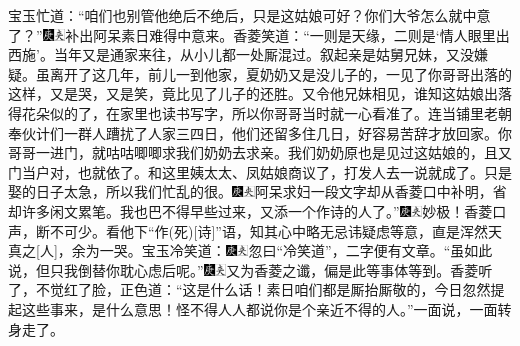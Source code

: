 宝玉忙道：``咱们也别管他绝后不绝后，只是这姑娘可好？你们大爷怎么就中意了？''{\includegraphics[width=3mm]{../Images/00004}\includegraphics[width=3mm]{../Images/00012}\footnotesize \kaishu 补出阿呆素日难得中意来。}香菱笑道：``一则是天缘，二则是`情人眼里出西施'。当年又是通家来往，从小儿都一处厮混过。叙起亲是姑舅兄妹，又没嫌疑。虽离开了这几年，前儿一到他家，夏奶奶又是没儿子的，一见了你哥哥出落的这样，又是哭，又是笑，竟比见了儿子的还胜。又令他兄妹相见，谁知这姑娘出落得花朵似的了，在家里也读书写字，所以你哥哥当时就一心看准了。连当铺里老朝奉伙计们一群人蹧扰了人家三四日，他们还留多住几日，好容易苦辞才放回家。你哥哥一进门，就咕咕唧唧求我们奶奶去求亲。我们奶奶原也是见过这姑娘的，且又门当户对，也就依了。和这里姨太太、凤姑娘商议了，打发人去一说就成了。只是娶的日子太急，所以我们忙乱的很。{\includegraphics[width=3mm]{../Images/00004}\includegraphics[width=3mm]{../Images/00012}\footnotesize \kaishu 阿呆求妇一段文字却从香菱口中补明，省却许多闲文累笔。}我也巴不得早些过来，又添一个作诗的人了。''{\includegraphics[width=3mm]{../Images/00004}\includegraphics[width=3mm]{../Images/00012}\footnotesize \kaishu 妙极！香菱口声，断不可少。看他下``作{(死)}{[}诗{]}''语，知其心中略无忌讳疑虑等意，直是浑然天真之{[}人{]}，余为一哭。}宝玉冷笑道：{\includegraphics[width=3mm]{../Images/00004}\includegraphics[width=3mm]{../Images/00012}\footnotesize \kaishu 忽曰``冷笑道''，二字便有文章。}``虽如此说，但只我倒替你耽心虑后呢。''{\includegraphics[width=3mm]{../Images/00004}\includegraphics[width=3mm]{../Images/00012}\footnotesize \kaishu 又为香菱之谶，偏是此等事体等到。}香菱听了，不觉红了脸，正色道：``这是什么话！素日咱们都是厮抬厮敬的，今日忽然提起这些事来，是什么意思！怪不得人人都说你是个亲近不得的人。''一面说，一面转身走了。

